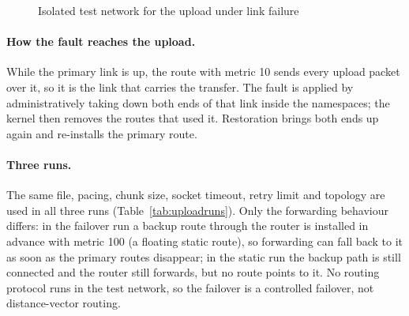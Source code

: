 \documentclass[12pt,a4paper]{report}
\numberwithin{equation}{chapter}
\begin{document}
\begin{figure}[H]
\centering
{}
\caption{Isolated test network for the upload under link failure}
\label{fig:uploadtopo}
\end{figure}

\paragraph{How the fault reaches the upload.} While the primary link is up, the route with metric 10 sends every upload packet over it, so it is the link that carries the transfer. The fault is applied by administratively taking down both ends of that link inside the namespaces; the kernel then removes the routes that used it. Restoration brings both ends up again and re-installs the primary route.

\paragraph{Three runs.} The same file, pacing, chunk size, socket timeout, retry limit and topology are used in all three runs (Table~\ref{tab:uploadruns}). Only the forwarding behaviour differs: in the failover run a backup route through the router is installed in advance with metric 100 (a floating static route), so forwarding can fall back to it as soon as the primary routes disappear; in the static run the backup path is still connected and the router still forwards, but no route points to it. No routing protocol runs in the test network, so the failover is a controlled failover, not distance-vector routing.
\end{document}
